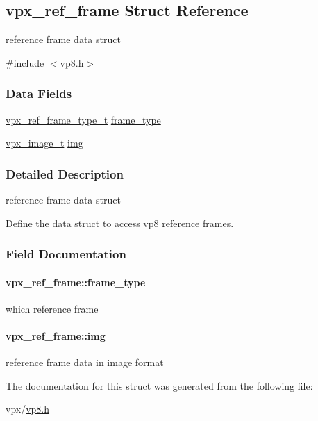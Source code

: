 \hypertarget{structvpx__ref__frame}{\subsection{vpx\+\_\+ref\+\_\+frame Struct Reference}
\label{structvpx__ref__frame}
}


reference frame data struct  




{\ttfamily \#include $<$vp8.\+h$>$}

\subsubsection*{Data Fields}
\begin{DoxyCompactItemize}
\item 
\hyperlink{group__vp8_ga75ac0689a81bf7202382a225c5b451b4}{vpx\+\_\+ref\+\_\+frame\+\_\+type\+\_\+t} \hyperlink{structvpx__ref__frame_a7fbe51de592d0ff16d9fbd4d2b367c9b}{frame\+\_\+type}
\item 
\hyperlink{vpx__image_8h_abf5ac962cc6d71b4f0e39b1b0d033e55}{vpx\+\_\+image\+\_\+t} \hyperlink{structvpx__ref__frame_a972d24d0243f51f84eef7e1b79c6c414}{img}
\end{DoxyCompactItemize}


\subsubsection{Detailed Description}
reference frame data struct 

Define the data struct to access vp8 reference frames. 

\subsubsection{Field Documentation}
\hypertarget{structvpx__ref__frame_a7fbe51de592d0ff16d9fbd4d2b367c9b}{
\paragraph[{frame\+\_\+type}]{ vpx\+\_\+ref\+\_\+frame\+::frame\+\_\+type}}\label{structvpx__ref__frame_a7fbe51de592d0ff16d9fbd4d2b367c9b}
which reference frame \hypertarget{structvpx__ref__frame_a972d24d0243f51f84eef7e1b79c6c414}{
\paragraph[{img}]{ vpx\+\_\+ref\+\_\+frame\+::img}}\label{structvpx__ref__frame_a972d24d0243f51f84eef7e1b79c6c414}
reference frame data in image format 

The documentation for this struct was generated from the following file\+:\begin{DoxyCompactItemize}
\item 
vpx/\hyperlink{vp8_8h}{vp8.\+h}\end{DoxyCompactItemize}
